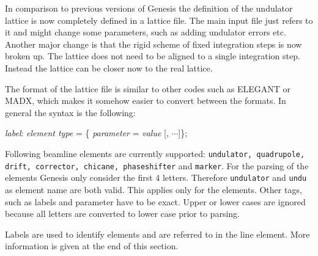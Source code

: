 \documentclass[12pt]{book}
\begin{document}
In comparison to previous versions of Genesis the definition of the undulator lattice is now completely defined in a lattice file. The main input file just refers to it and might change some parameters, such as adding undulator errors etc.
Another major change is that the rigid scheme of fixed integration steps is now broken up. The lattice does not need to be aligned to a single integration step. Instead the lattice can be closer now to the real lattice.

The format of the lattice file is similar to other codes such as ELEGANT or MADX, which makes it somehow easier to convert between the formats. In general the syntax is the following:

{\it label}: {\it element type} = \{ {\it parameter} = {\it value} [, $\cdots$]\};

Following beamline elements are currently supported: {\tt undulator, quadrupole, drift, corrector, chicane, phaseshifter} and {\tt marker}. For the parsing of the elements Genesis only consider the first 4 letters. Therefore {\tt undulator} and {\tt undu} as element name are both valid. This applies only for the elements. Other tags, such as labels and parameter have to be exact. Upper or lower cases are ignored because all letters are converted to lower case prior to parsing.

Labels are used to identify elements and are referred to in the line element. More information is given at the end of this section.
\end{document}
